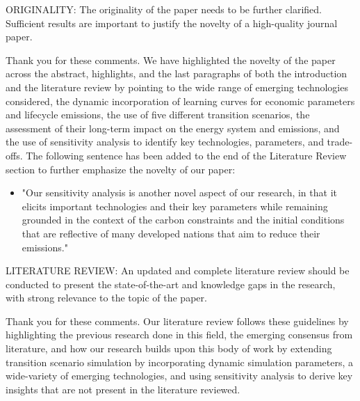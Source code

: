 \documentclass[answers,11pt]{exam}
\begin{document}
\begin{questions}
\begin{solution}
                
        \end{solution}

        \question  
   
     
ORIGINALITY: The originality of the paper needs to be further clarified. Sufficient results are important to justify the novelty of a high-quality journal paper.

 \begin{solution}
                Thank you for these comments. We have highlighted the novelty of the paper across the abstract, highlights, and the last paragraphs of both the introduction and the literature review by pointing to the wide range of emerging technologies considered, the dynamic incorporation of learning curves for economic parameters and lifecycle emissions, the use of five different transition scenarios, the assessment of their long-term impact on the energy system and emissions, and the use of sensitivity analysis to identify key technologies, parameters, and trade-offs. The following sentence has been added to the end of the Literature Review section to further emphasize the novelty of our paper:
                \begin{itemize}
                
\item "Our sensitivity analysis is another novel aspect of our research, in that it elicits important technologies and their key parameters while remaining grounded in the context of the carbon constraints and the initial conditions that are reflective of many developed nations that aim to reduce their emissions."                
                
                \end{itemize}
                
        \end{solution}

              \question  

 
LITERATURE REVIEW:  An updated and complete literature review should be conducted to present the state-of-the-art and knowledge gaps in the research, with strong relevance to the topic of the paper.
 \begin{solution}
                Thank you for these comments. Our literature review follows these guidelines by highlighting the previous research done in this field, the emerging consensus from literature, and how our research builds upon this body of work by extending transition scenario simulation by incorporating dynamic simulation parameters, a wide-variety of emerging technologies, and using sensitivity analysis to derive key insights that are not present in the literature reviewed.
                

\end{solution}
\end{questions}
\end{document}
